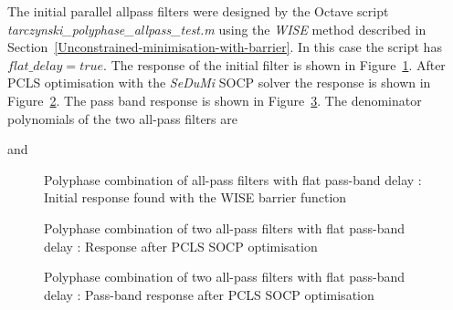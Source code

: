\documentclass[a4paper,twoside,10pt,english]{report}
\begin{document}
The initial parallel allpass filters were designed by the
Octave script \emph{tarczynski\_polyphase\_allpass\_test.m} using the \emph{WISE}
method described in Section~\ref{Unconstrained-minimisation-with-barrier}. In
this case the script has $flat\_delay = true$. The response of the initial 
filter is shown in
Figure~\ref{fig:Polyphase-allpass-filter-flat-delay-initial-response}.
After PCLS optimisation with the \emph{SeDuMi} SOCP solver the response is 
shown in Figure~\ref{fig:Polyphase-allpass-filter-flat-delay-PCLS-SOCP-response}.
The pass band response is shown in 
Figure~\ref{fig:Polyphase-allpass-filter-flat-delay-PCLS-SOCP-passband-response}.
The denominator polynomials of the two all-pass filters are
\begin{small}

\end{small}
and
\begin{small}

\end{small}
\begin{figure}[!htbp]
\begin{center}
\scalebox{0.7}{}
\caption{Polyphase combination of all-pass filters with flat pass-band delay : Initial response found with the WISE barrier function}
\label{fig:Polyphase-allpass-filter-flat-delay-initial-response}
\end{center}
\end{figure}
\begin{figure}[!htbp]
\begin{center}
\scalebox{0.7}{}
\caption{Polyphase combination of two all-pass filters with flat pass-band delay : Response after PCLS SOCP optimisation}
\label{fig:Polyphase-allpass-filter-flat-delay-PCLS-SOCP-response}
\end{center}
\end{figure}
\begin{figure}[!htbp]
\begin{center}
\scalebox{0.7}{}
\caption{Polyphase combination of two all-pass filters with flat pass-band delay : Pass-band response after PCLS SOCP optimisation}
\label{fig:Polyphase-allpass-filter-flat-delay-PCLS-SOCP-passband-response}
\end{center}
\end{figure}
\clearpage
\end{document}
